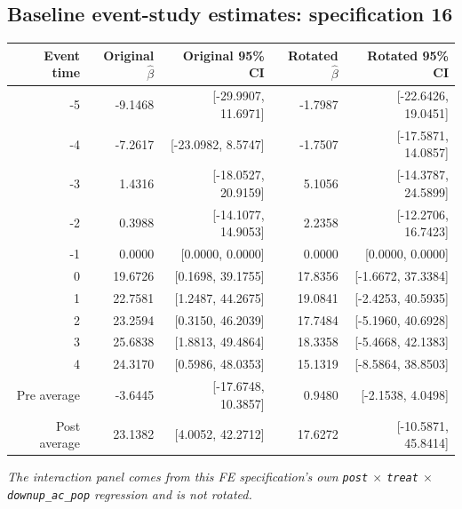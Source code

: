 \documentclass[10pt]{article}
\begin{document}
\subsection*{Baseline event-study estimates: specification 16}
\begin{center}
\scriptsize
\begin{tabular}{r rr rr}
\toprule
Event time & Original $\hat\beta$ & Original 95\% CI & Rotated $\hat\beta$ & Rotated 95\% CI \\
\midrule
-5 & -9.1468 & [-29.9907, 11.6971] & -1.7987 & [-22.6426, 19.0451] \\
-4 & -7.2617 & [-23.0982, 8.5747] & -1.7507 & [-17.5871, 14.0857] \\
-3 & 1.4316 & [-18.0527, 20.9159] & 5.1056 & [-14.3787, 24.5899] \\
-2 & 0.3988 & [-14.1077, 14.9053] & 2.2358 & [-12.2706, 16.7423] \\
-1 & 0.0000 & [0.0000, 0.0000] & 0.0000 & [0.0000, 0.0000] \\
0 & 19.6726 & [0.1698, 39.1755] & 17.8356 & [-1.6672, 37.3384] \\
1 & 22.7581 & [1.2487, 44.2675] & 19.0841 & [-2.4253, 40.5935] \\
2 & 23.2594 & [0.3150, 46.2039] & 17.7484 & [-5.1960, 40.6928] \\
3 & 25.6838 & [1.8813, 49.4864] & 18.3358 & [-5.4668, 42.1383] \\
4 & 24.3170 & [0.5986, 48.0353] & 15.1319 & [-8.5864, 38.8503] \\
\midrule
Pre average & -3.6445 & [-17.6748, 10.3857] & 0.9480 & [-2.1538, 4.0498] \\
Post average & 23.1382 & [4.0052, 42.2712] & 17.6272 & [-10.5871, 45.8414] \\
\bottomrule
\end{tabular}
\end{center}
\medskip
\textit{The interaction panel comes from this FE specification's own \texttt{post} $\times$ \texttt{treat} $\times$ \texttt{downup\_ac\_pop} regression and is not rotated.}
\clearpage
\end{document}
